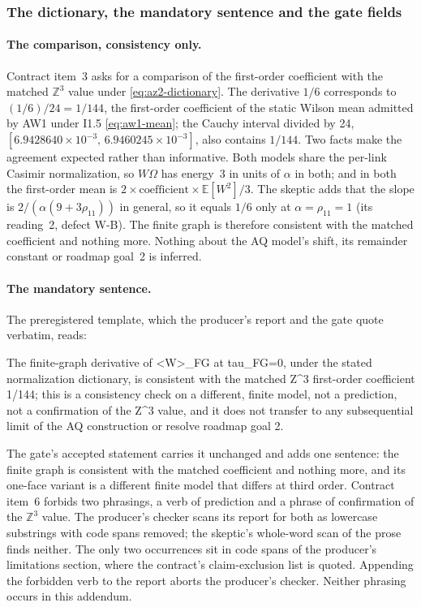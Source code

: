\subsubsection{The dictionary, the mandatory sentence and the gate fields}
\label{sec:az2-sentence}
\paragraph{The comparison, consistency only.}
Contract item~3 asks for a comparison of the first-order coefficient with the
matched $\mathbb Z^3$ value under \eqref{eq:az2-dictionary}. The derivative
$1/6$ corresponds to $(1/6)/24=1/144$, the first-order coefficient of the
static Wilson mean admitted by AW1 under I1.5 \eqref{eq:aw1-mean}; the Cauchy
interval divided by 24, $[6.9428640\times10^{-3},\,6.9460245\times10^{-3}]$,
also contains $1/144$. Two facts make the agreement expected rather than
informative. Both models share the per-link Casimir normalization, so
$W\Omega$ has energy~3 in units of $\alpha$ in both; and in both the
first-order mean is $2\times\text{coefficient}\times\mathbb E[W^2]/3$. The
skeptic adds that the slope is $2/(\alpha(9+3\rho_{11}))$ in general, so it
equals $1/6$ only at $\alpha=\rho_{11}=1$ (its reading~2, defect W-B). The finite graph is
therefore consistent with the matched coefficient and nothing more. Nothing
about the AQ model's shift, its remainder constant or roadmap goal~2 is
inferred.

\paragraph{The mandatory sentence.}
The preregistered template, which the producer's report and the gate quote
verbatim, reads:
\begin{gatequote}
The finite-graph derivative of <W>\_FG at tau\_FG=0, under the stated
normalization dictionary, is consistent with the matched Z\textasciicircum{}3
first-order coefficient 1/144; this is a consistency check on a different,
finite model, not a prediction, not a confirmation of the Z\textasciicircum{}3
value, and it does not transfer to any subsequential limit of the AQ
construction or resolve roadmap goal 2.
\end{gatequote}
The gate's accepted statement carries it unchanged and adds one sentence: the
finite graph is consistent with the matched coefficient and nothing more, and
its one-face variant is a different finite model that differs at third order.
Contract item~6 forbids two phrasings, a verb of prediction and a phrase of
confirmation of the $\mathbb Z^3$ value. The producer's checker scans its
report for both as lowercase substrings with code spans removed; the
skeptic's whole-word scan of the prose finds neither. The only two
occurrences sit in code spans of the producer's limitations section, where
the contract's claim-exclusion list is quoted. Appending the forbidden verb
to the report aborts the producer's checker. Neither phrasing occurs in this
addendum.

